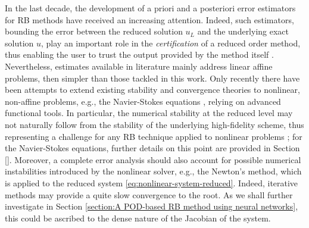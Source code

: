 \documentclass[12pt, a4paper, twoside, openright]{report}
\numberwithin{equation}{chapter}
\theoremstyle{theorem}
\theoremstyle{definition}
\theoremstyle{remark}
\theoremstyle{proposition}
\numberwithin{figure}{chapter}
\begin{document}
		In the last decade, the development of a priori and a posteriori error estimators for RB methods have received an increasing attention. Indeed, such estimators, bounding the error between the reduced solution $u_L$ and the underlying exact solution $u$, play an important role in the \emph{certification} of a reduced order method, thus enabling the user to trust the output provided by the method itself \cite{HSR16}. Nevertheless, estimates available in literature mainly address linear affine problems, then simpler than those tackled in this work. Only recently there have been attempts to extend existing stability and convergence theories to nonlinear, non-affine problems, e.g., the Navier-Stokes equations \cite{QMN15}, relying on advanced functional tools. In particular, the numerical stability at the reduced level may not naturally follow from the stability of the underlying high-fidelity scheme, thus representing a challenge for any RB technique applied to nonlinear problems \cite{Bal14}; for the Navier-Stokes equations, further details on this point are provided in Section \ref{}. Moreover, a complete error analysis should also account for possible numerical instabilities introduced by the nonlinear solver, e.g., the Newton's method, which is applied to the reduced system \eqref{eq:nonlinear-system-reduced}. Indeed, iterative methods may provide a quite slow convergence to the root. As we shall further investigate in Section \ref{section:A POD-based RB method using neural networks}, this could be ascribed to the dense nature of the Jacobian of the system.
		

		
\end{document}

